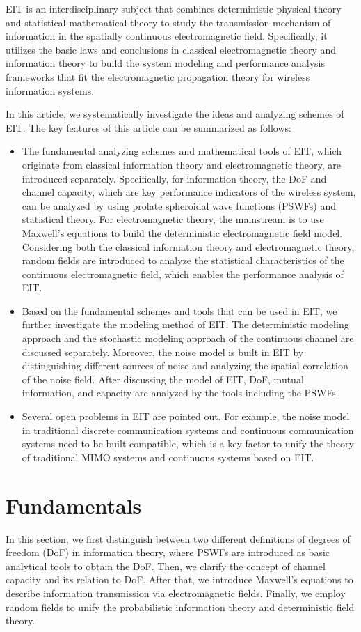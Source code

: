 \documentclass[journal,twocolumn]{IEEEtran}
\begin{document}
EIT is an interdisciplinary subject that combines deterministic physical theory and statistical mathematical theory to study the transmission mechanism of information in the spatially continuous electromagnetic field. 
Specifically, it utilizes the basic laws and conclusions in classical electromagnetic theory and information theory to build the system modeling and performance analysis frameworks that fit the electromagnetic propagation theory for wireless information systems. 
 
In this article, we systematically investigate the ideas and analyzing schemes of EIT. The key features of this article can be summarized as follows:
\begin{itemize}
\item{The fundamental analyzing schemes and mathematical tools of EIT, which originate from classical information theory and electromagnetic theory, are introduced separately. Specifically, for information theory, the DoF and channel capacity, which are key performance indicators of the wireless system, can be analyzed by using prolate spheroidal wave functions (PSWFs) and statistical theory. For electromagnetic theory, the mainstream is to use Maxwell's equations to build the deterministic electromagnetic field model. Considering both the classical information theory and electromagnetic theory, random fields are introduced to analyze the statistical characteristics of the continuous electromagnetic field, which enables the performance analysis of EIT. }
\item{Based on the fundamental schemes and tools that can be used in EIT, we further investigate the modeling method of EIT. The deterministic modeling approach and the stochastic modeling approach of the continuous channel are discussed separately. Moreover, the noise model is built in EIT by distinguishing different sources of noise and analyzing the spatial correlation of the noise field. After discussing the model of EIT, DoF, mutual information, and capacity are analyzed by the tools including the PSWFs.} 
\item{Several open problems in EIT are pointed out. For example, the noise model in traditional discrete communication systems and continuous communication systems need to be built compatible, which is a key factor to unify the theory of traditional MIMO systems and continuous systems based on EIT.}
\end{itemize}

\section{Fundamentals}
In this section, we first distinguish between two different definitions of degrees of freedom (DoF) in information theory, where PSWFs are introduced as basic analytical tools to obtain the DoF. 
Then, we clarify the concept of channel capacity and its relation to DoF. 
After that, we introduce Maxwell's equations to describe information transmission via electromagnetic fields. 
Finally, we employ random fields to unify the probabilistic information theory and deterministic field theory. 
\end{document}
